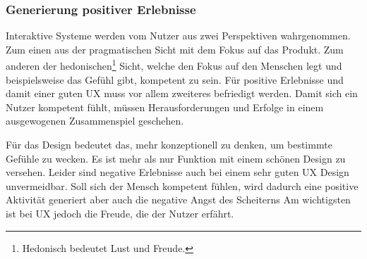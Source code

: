 \subsubsection*{Generierung positiver Erlebnisse}
Interaktive Systeme werden vom Nutzer aus zwei Perspektiven wahrgenommen. Zum einen aus der pragmatischen Sicht mit dem Fokus auf das Produkt. Zum anderen der hedonischen\footnote{Hedonisch bedeutet Lust und Freude.} Sicht, welche den Fokus auf den Menschen legt und beispielsweise das Gefühl gibt, kompetent zu sein. Für positive Erlebnisse und damit einer guten UX muss vor allem zweiteres befriedigt werden. Damit sich ein Nutzer kompetent fühlt, müssen Herausforderungen und Erfolge in einem ausgewogenen Zusammenspiel geschehen. \cite{Hassenzahl2008}

Für das Design bedeutet das, mehr konzeptionell zu denken, um bestimmte Gefühle zu wecken. Es ist mehr als nur Funktion mit einem schönen Design zu versehen. Leider sind negative Erlebnisse auch bei einem sehr guten UX Design unvermeidbar. Soll sich der Mensch kompetent fühlen, wird dadurch eine positive Aktivität generiert aber auch die negative Angst des Scheiterns Am wichtigsten ist bei UX jedoch die Freude, die der Nutzer erfährt. \cite{Hassenzahl2008}

